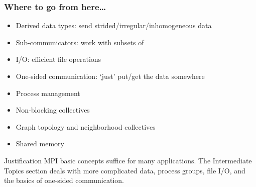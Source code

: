 \documentclass[10pt]{beamer}
\begin{document}

\renewcommand\standardversion{3}








\iffalse
\begin{exerciseframe}[serialsend]
  
\end{exerciseframe}
\fi

\begin{frame}[containsverbatim]\frametitle{Where to go from here\ldots}
  \begin{itemize}
  \item Derived data types: send strided/irregular/inhomogeneous data
  \item Sub-communicators: work with subsets of 
  \item I/O: efficient file operations
  \item One-sided communication: `just' put/get the data somewhere
  \item Process management
  \item Non-blocking collectives
  \item Graph topology and neighborhood collectives
  \item Shared memory
  \end{itemize}
\end{frame}

\renewcommand\standardversion{}


\begin{frame}{Justification}
  MPI basic concepts suffice for many applications.  The Intermediate
  Topics section deals with more complicated data, process groups,
  file I/O, and the basics of one-sided communication.
\end{frame}






\end{document}
